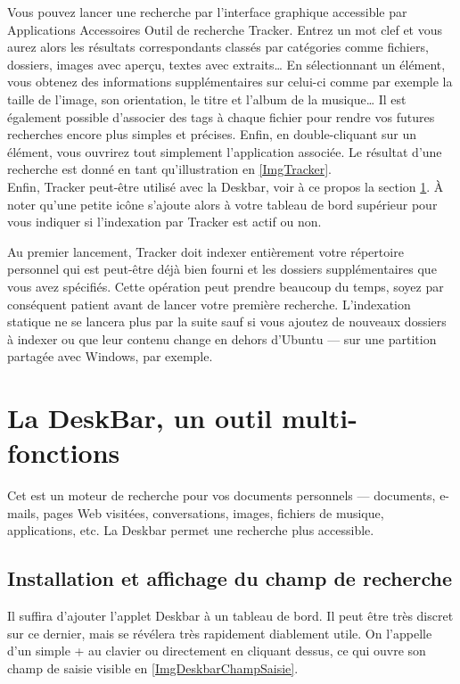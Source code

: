 Vous pouvez lancer une recherche par l'interface graphique accessible par Applications \FlecheDroite Accessoires \FlecheDroite Outil de recherche Tracker. Entrez un mot clef et vous aurez alors les résultats correspondants classés par catégories comme fichiers, dossiers, images avec aperçu, textes avec extraits\ldots{} En sélectionnant un élément, vous obtenez des informations supplémentaires sur celui-ci comme par exemple la taille de l'image, son orientation, le titre et l'album de la musique\ldots{} Il est également possible d'associer des tags à chaque fichier pour rendre vos futures recherches encore plus simples et précises. Enfin, en double-cliquant sur un élément, vous ouvrirez tout simplement l'application associée. Le résultat d'une recherche est donné en tant qu'illustration en \ref{ImgTracker}.\\
Enfin, Tracker peut-être utilisé avec la Deskbar, voir à ce propos la section \ref{RefDeskBar}.
À noter qu'une petite icône s'ajoute alors à votre tableau de bord supérieur pour vous indiquer si l'indexation par Tracker est actif ou non.
\begin{attention}
Au premier lancement, Tracker doit indexer entièrement votre répertoire personnel qui est peut-être déjà bien fourni et les dossiers supplémentaires que vous avez spécifiés. Cette opération peut prendre beaucoup du temps, soyez par conséquent patient avant de lancer votre première recherche. L'indexation statique ne se lancera plus par la suite sauf si vous ajoutez de nouveaux dossiers à indexer ou que leur contenu change en dehors d'Ubuntu --- sur une partition partagée avec Windows, par exemple.
\end{attention}
\section{La DeskBar, un outil multi-fonctions}
\label{RefDeskBar}
Cet   est un moteur de recherche pour vos documents personnels --- documents, e-mails, pages Web visitées, conversations, images, fichiers de musique, applications, etc. La Deskbar permet une recherche plus accessible.\par
\subsection{Installation et affichage du champ de recherche}
Il suffira d'ajouter l'applet Deskbar à un tableau de bord. Il peut être très discret sur ce dernier, mais se révélera très rapidement diablement utile. On l'appelle d'un simple  +  au clavier ou directement en cliquant dessus, ce qui ouvre son champ de saisie visible en \ref{ImgDeskbarChampSaisie}.
